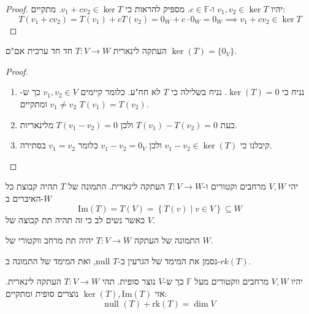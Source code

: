 \documentclass{tstextbook}
\begin{document}
\begin{proof}
יהיו \(v_{1},v_{2} \in \ker T\) ו-\(c \in \mathbb{F}\). מספיק להראות כי \(v_{1}+cv_{2}\in \ker T\). מתקיים:
$$T(v_{1}+cv_{2})=T(v_{1})+cT(v_{2})=0_{W}+c\cdot 0_{W}=0_{W}\implies v_{1}+cv_{2}\in \ker  T$$

\end{proof}
\begin{proposition}
העתקה לינארית \(T:V\to W\) חד חד ערכית אם"ם \(\ker(T)=\{ 0_{V} \}\).

\end{proposition}
\begin{proof}
  \begin{enumerate}
    \item נניח כי \(\ker (T)=0\). נניח בשלילה כי \(T\) לא חח"ע. כלומר קיימים \(v_{1},v_{2} \in V\) כך ש-\(v_{1}\neq v_{2}\) ומתקיים \(T(v_{1})=T(v_{2})\). 


    \item כעת \(T(v_{1})-T(v_{2})=0\) ולכן \(T(v_{1}-v_{2})=0\) מלינאריות. 


    \item קיבלנו כי \(v_{1}-v_{2} \in \ker(T)\) ולכן \(v_{1}-v_{2}=0_{V}\) כלומר \(v_{1}=v_{2}\) בסתירה. 


  \end{enumerate}
\end{proof}
\begin{definition}
יהי \(V,W\) מרחבים וקטורים ו-\(T:V\to W\) העתקה לינארית. התמונה של \(T\) תהיה קבוצת כל האיברים ב-\(W\)$$\mathrm{Im}(T)=T(V)=\left\{  T(v)\mid v \in V  \right\}\subseteq W$$
כאשר נשים לב כי זה תהיה תת קבוצה של \(V\).

\end{definition}
\begin{proposition}
התמונה של העתקה \(T:V\to W\) יהיה תת מרחב ווקטורי של \(W\).

\end{proposition}
\begin{symbolize}
נסמן את המימד של הגרעין ב-\(\text{null } T\), ואת המימד של התמונה ב-\(rk(T)\).

\end{symbolize}
\begin{theorem}[המימדים]
יהיו \(V,W\) מרחבים ווקטורים מעל \(\mathbb{F}\) כך ש-\(V\) נוצר סופית. תהי \(T:V\to W\) העתקה לינארית. אזי \(\ker (T),\mathrm{Im}(T)\) נוצרים סופית ומתקיים:
$$\text{null }(T)+\mathrm{rk}(T)=\dim V$$

\end{theorem}
\end{document}
